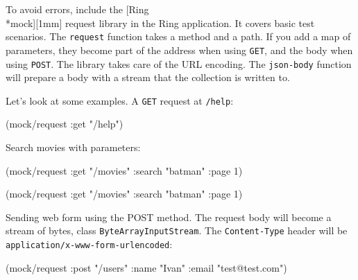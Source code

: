 \fi


To avoid errors, include the [Ring\\*mock][1mm] request library in the Ring application. It covers basic test scenarios. The \verb|request| function takes a method and a path. If you add a map of parameters, they become part of the address when using \verb|GET|, and the body when using \verb|POST|. The library takes care of the URL encoding. The \verb|json-body| function will prepare a body with a stream that the collection is written to.

Let's look at some examples. A \verb|GET| request at \verb|/help|:

\begin{english}
  \begin{clojure}
(mock/request :get "/help")
  \end{clojure}
\end{english}

\noindent
Search movies with parameters:

\ifnarrow

\begin{english}
  \begin{clojure}
(mock/request :get "/movies"
  {:search "batman" :page 1})
  \end{clojure}
\end{english}

\else

\begin{english}
  \begin{clojure}
(mock/request :get "/movies" {:search "batman" :page 1})
  \end{clojure}
\end{english}

\fi


\noindent
Sending web form using the POST method. The request body will become a stream of bytes, class \texttt{ByteArrayInput\-Stream}. The \verb|Content-Type| header will be \verb|application/x-www-form-urlencoded|:

\ifnarrow

\begin{english}
  \begin{clojure}
(mock/request :post "/users"
  {:name "Ivan" :email "test@test.com"})
  \end{clojure}
\end{english}

